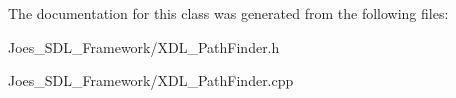 The documentation for this class was generated from the following files\-:\begin{DoxyCompactItemize}
\item 
Joes\-\_\-\-S\-D\-L\-\_\-\-Framework/X\-D\-L\-\_\-\-Path\-Finder.\-h\item 
Joes\-\_\-\-S\-D\-L\-\_\-\-Framework/X\-D\-L\-\_\-\-Path\-Finder.\-cpp\end{DoxyCompactItemize}

